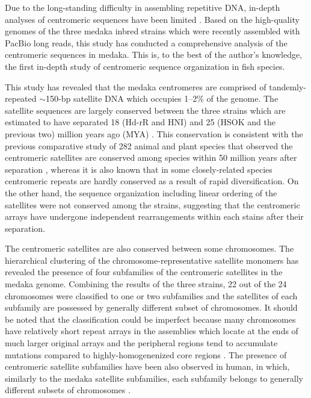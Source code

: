 Due to the long-standing difficulty in assembling repetitive DNA, in-depth analyses of centromeric sequences have been limited \cite{Plohl2014}. Based on the high-quality genomes of the three medaka inbred strains which were recently assembled with PacBio long reads, this study has conducted a comprehensive analysis of the centromeric sequences in medaka. This is, to the best of the author's knowledge, the first in-depth study of centromeric sequence organization in fish species.

This study has revealed that the medaka centromeres are comprised of tandemly-repeated $\sim$150-bp satellite DNA which occupies 1--2\% of the genome. The satellite sequences are largely conserved between the three strains which are estimated to have separated 18 (Hd-rR and HNI) and 25 (HSOK and the previous two) million years ago (MYA) \cite{Setiamarga2009}. This conservation is consistent with the previous comparative study of 282 animal and plant species that observed the centromeric satellites are conserved among species within 50 million years after separation \cite{Melters2013}, whereas it is also known that in some closely-related species centromeric repeats are hardly conserved as a result of rapid diversification\cite{Lee2005}. On the other hand, the sequence organization including linear ordering of the satellites were not conserved among the strains, suggesting that the centromeric arrays have undergone independent rearrangements within each stains after their separation.

The centromeric satellites are also conserved between some chromosomes. The hierarchical clustering of the chromosome-representative satellite monomers has revealed the presence of four subfamilies of the centromeric satellites in the medaka genome. Combining the results of the three strains, 22 out of the 24 chromosomes were classified to one or two subfamilies and the satellites of each subfamily are possessed by generally different subset of chromosomes. It should be noted that the classification could be imperfect because many chromosomes have relatively short repeat arrays in the assemblies which locate at the ends of much larger original arrays and the peripheral regions tend to accumulate mutations compared to highly-homogenenized core regions \cite{Smith1976, Schueler2001}. The presence of centromeric satellite subfamilies have been also observed in human, in which, similarly to the medaka satellite subfamilies, each subfamily belongs to generally different subsets of chromosomes \cite{Alexandrov2001}.


